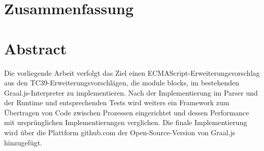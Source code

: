 	{\let\clearpage\relax
	\ifeng	{} \chapter*{Zusammenfassung}
	\else	{} \chapter*{Abstract}
	\fi
		

Die vorliegende Arbeit verfolgt das Ziel einen ECMAScript-Erweiterungsvorschlag aus den TC39-Erweiterungsvorschlägen, die module blocks, im bestehenden Graal.js-Interpreter zu implementieren. Nach der Implementierung im Parser und der Runtime und entsprechenden Tests wird weiters ein Framework zum Übertragen von Code zwischen Prozessen eingerichtet und dessen Performance mit ursprünglichen Implementierungen verglichen. Die finale Implementierung wird über die Plattform github.com der Open-Source-Version von Graal.js hinzugefügt.

	\ifeng	{}
	\else 	{}
	\fi}
